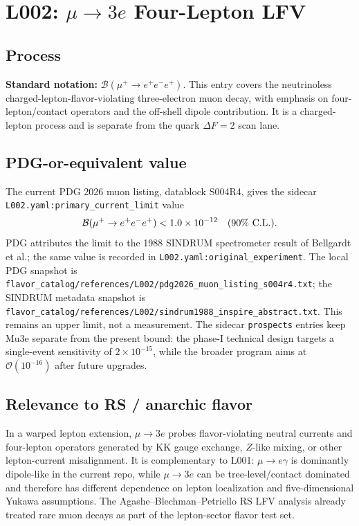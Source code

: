 
\section{L002: \texorpdfstring{\(\mu\to 3e\)}{mu -> 3e} Four-Lepton LFV}

\subsection*{Process}
\textbf{Standard notation:} \(\mathcal{B}(\mu^+\to e^+e^-e^+)\).
This entry covers the neutrinoless charged-lepton-flavor-violating
three-electron muon decay, with emphasis on four-lepton/contact operators and
the off-shell dipole contribution.  It is a charged-lepton process and is
separate from the quark \(\Delta F=2\) scan lane.

\subsection*{PDG-or-equivalent value}
The current PDG 2026 muon listing, datablock S004R4, gives the sidecar
\texttt{L002.yaml:primary\_current\_limit} value
\[
  \mathcal{B}(\mu^+\to e^+e^-e^+) < 1.0\times 10^{-12}\quad (90\%\ {\rm C.L.}).
\]
PDG attributes the limit to the 1988 SINDRUM spectrometer result of Bellgardt
et al.; the same value is recorded in \texttt{L002.yaml:original\_experiment}.
The local PDG snapshot is
\texttt{flavor\_catalog/references/L002/pdg2026\_muon\_listing\_s004r4.txt};
the SINDRUM metadata snapshot is
\texttt{flavor\_catalog/references/L002/sindrum1988\_inspire\_abstract.txt}.
This remains an upper limit, not a measurement.  The sidecar \texttt{prospects}
entries keep Mu3e separate from the present bound: the phase-I technical design
targets a single-event sensitivity of \(2\times10^{-15}\), while the broader
program aims at \(\mathcal{O}(10^{-16})\) after future upgrades.

\subsection*{Relevance to RS / anarchic flavor}
In a warped lepton extension, \(\mu\to 3e\) probes flavor-violating neutral
currents and four-lepton operators generated by KK gauge exchange, \(Z\)-like
mixing, or other lepton-current misalignment.  It is complementary to L001:
\(\mu\to e\gamma\) is dominantly dipole-like in the current repo, while
\(\mu\to 3e\) can be tree-level/contact dominated and therefore has different
dependence on lepton localization and five-dimensional Yukawa assumptions.
The Agashe--Blechman--Petriello RS LFV analysis already treated rare muon decays
as part of the lepton-sector flavor test set.

